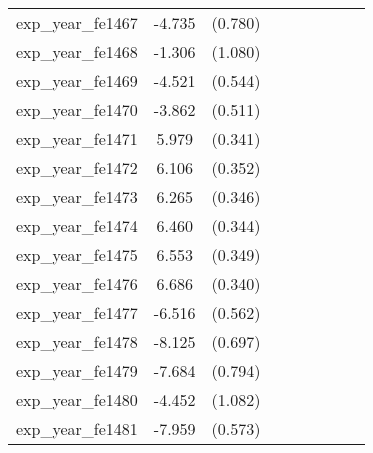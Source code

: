 {\begin{tabular}{l*{4}{cc}}
exp\_year\_fe1467&   -4.735\sym{***}&  (0.780)&                  &         &                  &         &                  &         \\
exp\_year\_fe1468&   -1.306         &  (1.080)&                  &         &                  &         &                  &         \\
exp\_year\_fe1469&   -4.521\sym{***}&  (0.544)&                  &         &                  &         &                  &         \\
exp\_year\_fe1470&   -3.862\sym{***}&  (0.511)&                  &         &                  &         &                  &         \\
exp\_year\_fe1471&    5.979\sym{***}&  (0.341)&                  &         &                  &         &                  &         \\
exp\_year\_fe1472&    6.106\sym{***}&  (0.352)&                  &         &                  &         &                  &         \\
exp\_year\_fe1473&    6.265\sym{***}&  (0.346)&                  &         &                  &         &                  &         \\
exp\_year\_fe1474&    6.460\sym{***}&  (0.344)&                  &         &                  &         &                  &         \\
exp\_year\_fe1475&    6.553\sym{***}&  (0.349)&                  &         &                  &         &                  &         \\
exp\_year\_fe1476&    6.686\sym{***}&  (0.340)&                  &         &                  &         &                  &         \\
exp\_year\_fe1477&   -6.516\sym{***}&  (0.562)&                  &         &                  &         &                  &         \\
exp\_year\_fe1478&   -8.125\sym{***}&  (0.697)&                  &         &                  &         &                  &         \\
exp\_year\_fe1479&   -7.684\sym{***}&  (0.794)&                  &         &                  &         &                  &         \\
exp\_year\_fe1480&   -4.452\sym{***}&  (1.082)&                  &         &                  &         &                  &         \\
exp\_year\_fe1481&   -7.959\sym{***}&  (0.573)&                  &         &                  &         &                  &         \\

\end{tabular}}
